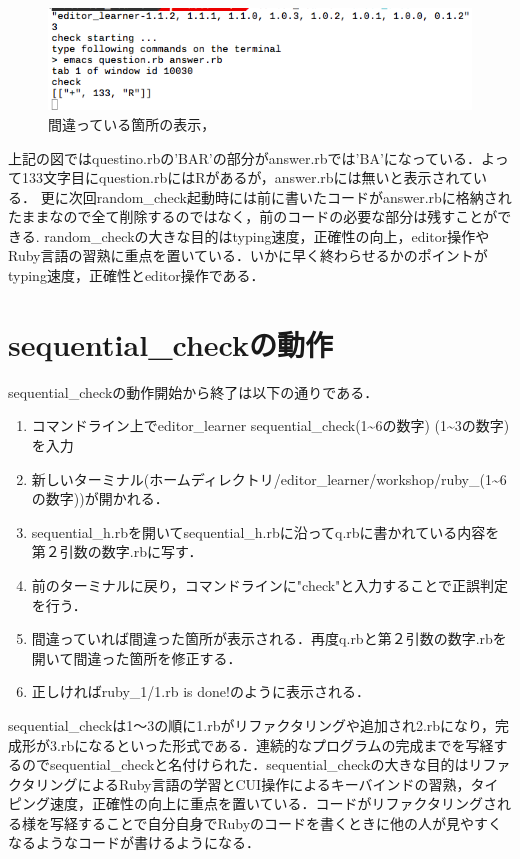 \begin{figure}[H]
\centering
\begin{center}
\includegraphics[width=150mm]{../../picture/diff.png}
\end{center}
\caption{間違っている箇所の表示，\label{sample}}
\end{figure}
上記の図ではquestino.rbの'BAR'の部分がanswer.rbでは’BA'になっている．よって133文字目にquestion.rbにはRがあるが，answer.rbには無いと表示されている．
更に次回random\_check起動時には前に書いたコードがanswer.rbに格納されたままなので全て削除するのではなく，前のコードの必要な部分は残すことができる.
random\_checkの大きな目的はtyping速度，正確性の向上，editor操作やRuby言語の習熟に重点を置いている．いかに早く終わらせるかのポイントがtyping速度，正確性とeditor操作である．

    \section{sequential\_checkの動作}\label{sequential_checkux306eux52d5ux4f5c}

    sequential\_checkの動作開始から終了は以下の通りである．

\begin{enumerate}
\def\labelenumi{\arabic{enumi}.}
\tightlist
\item
  コマンドライン上でeditor\_learner
  sequential\_check(1\textasciitilde{}6の数字)
  (1\textasciitilde{}3の数字)を入力
\item
  新しいターミナル(ホームディレクトリ/editor\_learner/workshop/ruby\_(1\textasciitilde{}6の数字))が開かれる．
\item
  sequential\_h.rbを開いてsequential\_h.rbに沿ってq.rbに書かれている内容を第２引数の数字.rbに写す．
\item
  前のターミナルに戻り，コマンドラインに"check"と入力することで正誤判定を行う．
\item
  間違っていれば間違った箇所が表示される．再度q.rbと第２引数の数字.rbを開いて間違った箇所を修正する．
\item
  正しければruby\_1/1.rb is done!のように表示される．
\end{enumerate}
sequential\_checkは1〜3の順に1.rbがリファクタリングや追加され2.rbになり，完成形が3.rbになるといった形式である．連続的なプログラムの完成までを写経するのでsequential\_checkと名付けられた．sequential\_checkの大きな目的はリファクタリングによるRuby言語の学習とCUI操作によるキーバインドの習熟，タイピング速度，正確性の向上に重点を置いている．コードがリファクタリングされる様を写経することで自分自身でRubyのコードを書くときに他の人が見やすくなるようなコードが書けるようになる．